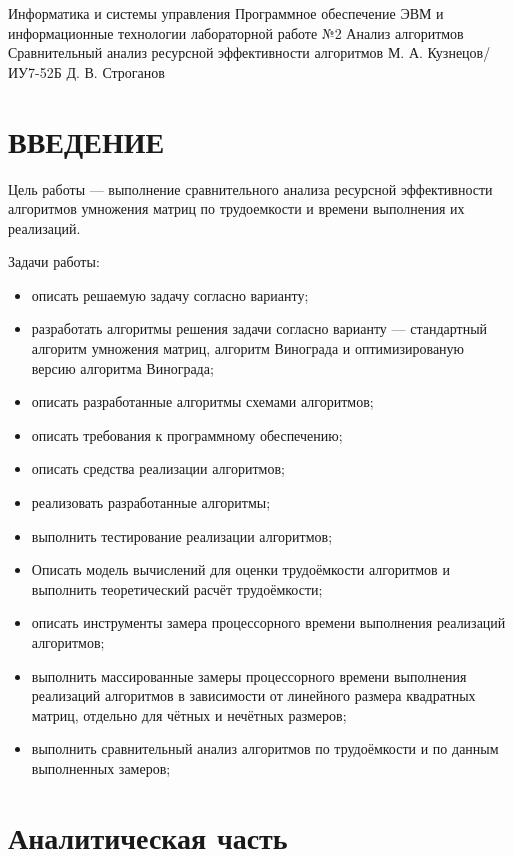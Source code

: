 \documentclass{bmstu}
\begin{document}
\makereporttitle
{Информатика и системы управления}
{Программное обеспечение ЭВМ и информационные технологии}
{лабораторной работе №2}
{Анализ алгоритмов}
{Сравнительный анализ ресурсной эффективности алгоритмов}
{} %
{М. А. Кузнецов/ИУ7-52Б} %
{Д. В. Строганов}

\maketableofcontents

\chapter*{ВВЕДЕНИЕ}

Цель работы --- выполнение сравнительного анализа ресурсной
эффективности алгоритмов умножения матриц по трудоемкости и времени
выполнения их реализаций.

Задачи работы:

\renewcommand{\labelitemi}{---}
\begin{itemize}
	\item описать решаемую задачу согласно варианту;
	\item разработать алгоритмы решения задачи согласно варианту ---
	      стандартный алгоритм умножения матриц, алгоритм Винограда и
	      оптимизированую версию алгоритма Винограда;
	\item описать разработанные алгоритмы схемами алгоритмов;
	\item описать требования к программному обеспечению;
	\item описать средства реализации алгоритмов;
	\item реализовать разработанные алгоритмы;
	\item выполнить тестирование реализации алгоритмов;
	\item Описать модель вычислений для оценки трудоёмкости алгоритмов и
	      выполнить теоретический расчёт трудоёмкости;
	\item описать инструменты замера процессорного времени выполнения
	      реализаций алгоритмов;
	\item выполнить массированные замеры процессорного времени
	      выполнения реализаций алгоритмов в зависимости от линейного
	      размера квадратных матриц, отдельно для чётных и нечётных
	      размеров;
	\item выполнить сравнительный анализ алгоритмов по трудоёмкости и по
	      данным выполненных замеров;
\end{itemize}

\chapter{Аналитическая часть}
\end{document}
